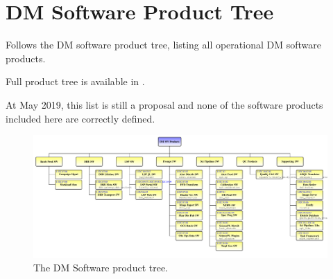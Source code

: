 \newpage
\section{DM Software Product Tree}\label{sec:swptree}

Follows the \gls{DM} software product tree, listing all operational \gls{DM} software products.

Full product tree is available in .

At May 2019, this list is still a proposal and none of the software products included here are correctly defined.


\begin{figure}
\begin{center}
 \includegraphics[width=1.1\textwidth]{ProductTreeLand}

 \caption{The \gls{DM} Software product tree.}
 \label{fig:doctree}

\end{center}
\end{figure}


